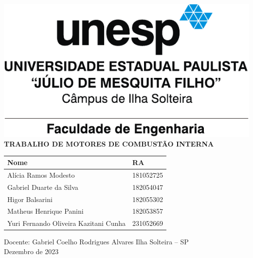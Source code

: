 \documentclass[
    12pt,                %
    brazil,              %
    a4paper,             %
    openany,             %
    oneside,             %
    chapter=TITLE,       %
]{abntex2}
\renewcommand{\imprimircapa}{%
    \begin{center}\sffamily
        \includegraphics{./figuras/feis_unesp.pdf}
        \vfill
        {\bfseries\large TRABALHO DE MOTORES DE COMBUSTÃO INTERNA}
        \vfill
        \begin{tabular}{ll}
            Nome & RA \\ \hline
            Alícia Ramos Modesto                  & 181052725 \\
            Gabriel Duarte da Silva               & 182054047 \\
            Higor Balsarini                       & 182055302 \\
            Matheus Henrique Panini               & 182053857 \\
            Yuri Fernando Oliveira Kazitani Cunha & 231052669
        \end{tabular}
        \vfill
        Docente: Gabriel Coelho Rodrigues Alvares
        \vfill
        Ilha Solteira -- SP \\
        Dezembro de 2023
    \end{center}
    \clearpage
}
\begin{document}
%
\imprimircapa\clearpage    %
\listoffigures*\clearpage   %
\listoftables*\clearpage    %
\tableofcontents*\clearpage %

\textual






\printbibliography
	
\end{document}

